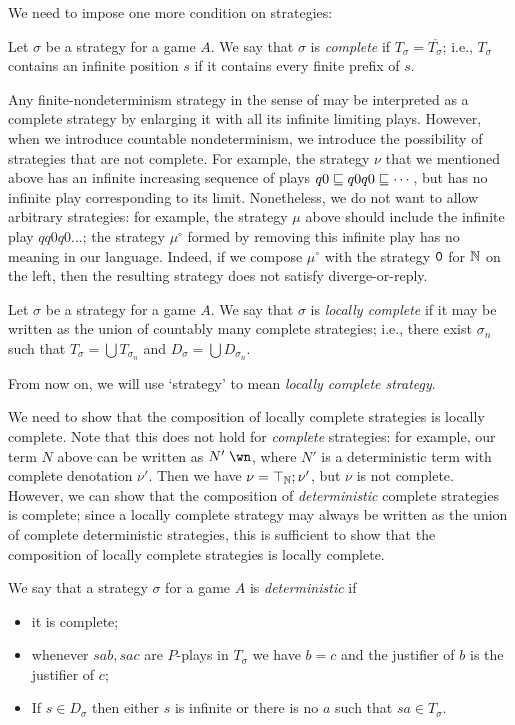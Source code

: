\documentclass[sigplan,10pt,review]{acmart}\settopmatter{printfolios=true,printccs=false,printacmref=false}
\begin{document}
We need to impose one more condition on strategies:
\begin{definition}
  Let $\sigma$ be a strategy for a game $A$.  
  We say that $\sigma$ is \emph{complete} if $T_\sigma=\overline{T_\sigma}$; i.e., $T_\sigma$ contains an infinite position $s$ if it contains every finite prefix of $s$.  
\end{definition}

Any finite-nondeterminism strategy in the sense of \cite{mcCHFiniteND} may be interpreted as a complete strategy by enlarging it with all its infinite limiting plays.  
However, when we introduce countable nondeterminism, we introduce the possibility of strategies that are not complete.  
For example, the strategy $\nu$ that we mentioned above has an infinite increasing sequence of plays $q0\sqsubseteq q0q0\sqsubseteq \cdots$, but has no infinite play corresponding to its limit.  
Nonetheless, we do not want to allow arbitrary strategies: for example, the strategy $\mu$ above should include the infinite play $qq0q0\dots$; the strategy $\mu^\circ$ formed by removing this infinite play has no meaning in our language.  
Indeed, if we compose $\mu^\circ$ with the strategy ${\mathtt{0}}$ for $\mathbb{N}$ on the left, then the resulting strategy does not satisfy diverge-or-reply.

\begin{definition}
  Let $\sigma$ be a strategy for a game $A$.  
  We say that $\sigma$ is \emph{locally complete} if it may be written as the union of countably many complete strategies; i.e., there exist $\sigma_n$ such that $T_\sigma=\bigcup T_{\sigma_n}$ and $D_\sigma=\bigcup D_{\sigma_n}$.
\end{definition}

From now on, we will use `strategy' to mean \emph{locally complete strategy}.

We need to show that the composition of locally complete strategies is locally complete.  
Note that this does not hold for \emph{complete} strategies: for example, our term $N$ above can be written as $N'\;\wn$, where $N'$ is a deterministic term with complete denotation $\nu'$.  
Then we have $\nu=\top_{\mathbb{N}};\nu'$, but $\nu$ is not complete.
However, we can show that the composition of \emph{deterministic} complete strategies is complete; since a locally complete strategy may always be written as the union of complete deterministic strategies, this is sufficient to show that the composition of locally complete strategies is locally complete.

\begin{definition}
  We say that a strategy $\sigma$ for a game $A$ is \emph{deterministic} if
  \begin{itemize}
    \item it is complete;
    \item whenever $sab,sac$ are $P$-plays in $T_\sigma$ we have $b=c$ and the justifier of $b$ is the justifier of $c$;
    \item If $s\in D_\sigma$ then either $s$ is infinite or there is no $a$ such that $sa\in T_\sigma$.
  \end{itemize}
\end{definition}
\end{document}
